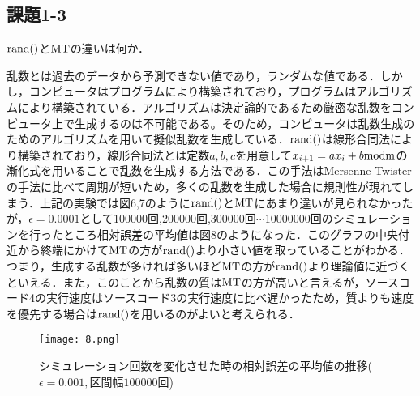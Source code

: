 \documentclass[12pt]{jarticle}
\begin{document}
\subsection{課題1-3}
\begin{shadebox}
    \quad $\rm{rand()}$と$\rm{MT}$の違いは何か．
\end{shadebox}
\vspace{\baselineskip}
乱数とは過去のデータから予測できない値であり，ランダムな値である．しかし，コンピュータはプログラムにより構築されており，プログラムはアルゴリズムにより構築されている．アルゴリズムは決定論的であるため厳密な乱数をコンピュータ上で生成するのは不可能である。そのため，コンピュータは乱数生成のためのアルゴリズムを用いて擬似乱数を生成している．$\rm{rand()}$は線形合同法により構築されており，線形合同法とは定数$a,b,c$を用意して$x_{i+1}=ax_i+b \rm{mod} m$の漸化式を用いることで乱数を生成する方法である．この手法はMersenne Twisterの手法に比べて周期が短いため，多くの乱数を生成した場合に規則性が現れてしまう．上記の実験では図6,7のように$\rm{rand()}$と$\rm{MT}$にあまり違いが見られなかったが，$\epsilon=0.0001$として100000回,200000回,300000回$\cdots$10000000回のシミュレーションを行ったところ相対誤差の平均値は図8のようになった．このグラフの中央付近から終端にかけて$\rm{MT}$の方が$\rm{rand()}$より小さい値を取っていることがわかる．つまり，生成する乱数が多ければ多いほど$\rm{MT}$の方が$\rm{rand()}$より理論値に近づくといえる．また，このことから乱数の質は$\rm{MT}$の方が高いと言えるが，ソースコード4の実行速度はソースコード3の実行速度に比べ遅かったため，質よりも速度を優先する場合は$\rm{rand()}$を用いるのがよいと考えられる．
\begin{figure}[H]
    \begin{center}
        \texttt{[image: 8.png]}
    \end{center}
    \caption{シミュレーション回数を変化させた時の相対誤差の平均値の推移($\epsilon=0.001,区間幅100000回$)}
    \label{fig1}
\end{figure}
\end{document}

